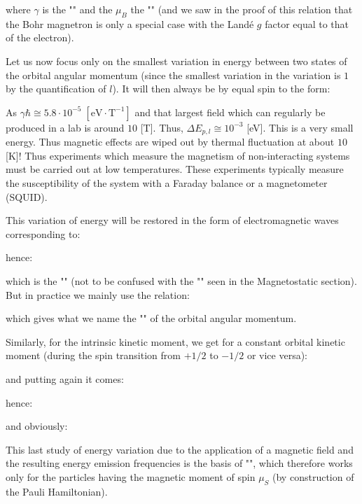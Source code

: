 	where $\gamma$ is the "" and the $\mu_B$ the "" (and we saw in the proof of this relation that the Bohr magnetron is only a special case with the Landé $g$ factor equal to that of the electron).
	
	Let us now focus only on the smallest variation in energy between two states of the orbital angular momentum (since the smallest variation in the variation is $1$ by the quantification of $l$). It will then always be by equal spin to the form:
	
	\begin{tcolorbox}[title=Remark,colframe=black,arc=10pt]
	As $\gamma\hbar\cong 5.8\cdot 10^{-5}\;[\text{eV}\cdot\text{T}^{-1}]$ and that largest field which can regularly be produced in a lab is around $10$ [T]. Thus, $\Delta E_{p,l}\cong 10^{-3}$ [eV]. This is a very small energy. Thus magnetic effects are wiped out by thermal fluctuation at about $10$ [K]! Thus experiments which measure the magnetism of non-interacting systems must be carried out at low temperatures. These experiments typically measure the susceptibility
of the system with a Faraday balance or a magnetometer (SQUID).
	\end{tcolorbox}
	This variation of energy will be restored in the form of electromagnetic waves corresponding to:
	
	hence:
	
	which is the "" (not to be confused with the "" seen in the Magnetostatic section). But in practice we mainly use the relation:
	
	which gives what we name the "" of the orbital angular momentum.
	
	Similarly, for the intrinsic kinetic moment, we get for a constant orbital kinetic moment (during the spin transition from $+1/2$ to $-1/2$ or vice versa):
	
	and putting again it comes:
	
	hence:
	
	and obviously:
	
	This last study of energy variation due to the application of a magnetic field and the resulting energy emission frequencies is the basis of "", which therefore works only for the particles having the magnetic moment of spin $\mu_S$ (by construction of the Pauli Hamiltonian).
	
